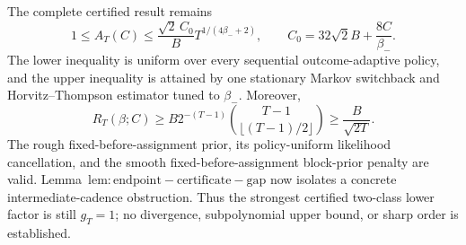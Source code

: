 The complete certified result remains \[1\le A_T(C)\le\frac{\sqrt2\,C_0}{B}T^{1/(4\beta_-+2)},\qquad C_0=32\sqrt2 B+\frac{8C}{\beta_-}.\] The lower inequality is uniform over every sequential outcome-adaptive policy, and the upper inequality is attained by one stationary Markov switchback and Horvitz--Thompson estimator tuned to \(\beta_-\). Moreover, \[R_T(\beta;C)\ge B2^{-(T-1)}\binom{T-1}{\lfloor(T-1)/2\rfloor}\ge\frac{B}{\sqrt{2T}}.\] The rough fixed-before-assignment prior, its policy-uniform likelihood cancellation, and the smooth fixed-before-assignment block-prior penalty are valid. Lemma~\(\mathrm{lem:endpoint-certificate-gap}\) now isolates a concrete intermediate-cadence obstruction. Thus the strongest certified two-class lower factor is still \(g_T=1\); no divergence, subpolynomial upper bound, or sharp order is established.